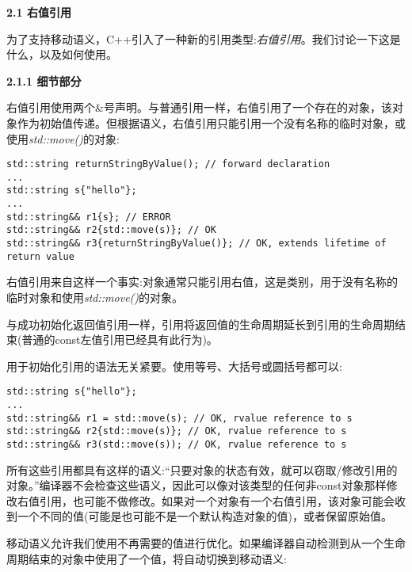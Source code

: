 \hspace*{\fill} \par %
\textbf{2.1 右值引用}

为了支持移动语义，C++引入了一种新的引用类型:\textit{右值引用}。我们讨论一下这是什么，以及如何使用。\par

\hspace*{\fill} \par %
\textbf{2.1.1 细节部分}

右值引用使用两个\&号声明。与普通引用一样，右值引用了一个存在的对象，该对象作为初始值传递。但根据语义，右值引用只能引用一个没有名称的临时对象，或使用\textit{std::move()}的对象:\par

\begin{lstlisting}[caption={}]
std::string returnStringByValue(); // forward declaration
...
std::string s{"hello"};
...
std::string&& r1{s}; // ERROR
std::string&& r2{std::move(s)}; // OK
std::string&& r3{returnStringByValue()}; // OK, extends lifetime of return value
\end{lstlisting}

右值引用来自这样一个事实:对象通常只能引用右值，这是类别，用于没有名称的临时对象和使用\textit{std::move()}的对象。\par

与成功初始化返回值引用一样，引用将返回值的生命周期延长到引用的生命周期结束(普通的const左值引用已经具有此行为)。\par

用于初始化引用的语法无关紧要。使用等号、大括号或圆括号都可以:\par

\begin{lstlisting}[caption={}]
std::string s{"hello"};
...
std::string&& r1 = std::move(s); // OK, rvalue reference to s
std::string&& r2{std::move(s)}; // OK, rvalue reference to s
std::string&& r3(std::move(s)); // OK, rvalue reference to s
\end{lstlisting}

所有这些引用都具有这样的语义:“只要对象的状态有效，就可以窃取/修改引用的对象。”编译器不会检查这些语义，因此可以像对该类型的任何非const对象那样修改右值引用，也可能不做修改。如果对一个对象有一个右值引用，该对象可能会收到一个不同的值(可能是也可能不是一个默认构造对象的值)，或者保留原始值。\par

移动语义允许我们使用不再需要的值进行优化。如果编译器自动检测到从一个生命周期结束的对象中使用了一个值，将自动切换到移动语义:\par

